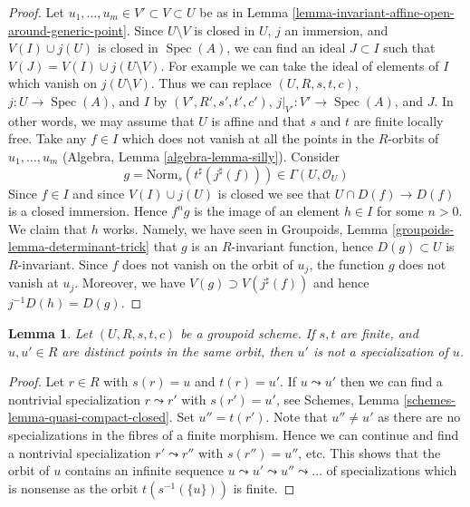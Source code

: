 \documentclass{stacks-project}
\theoremstyle{plain}
\newtheorem{lemma}[subsection]{Lemma}
\theoremstyle{definition}
\theoremstyle{remark}
\numberwithin{equation}{subsection}
\def\Spec{\mathop{\mathrm{Spec}}}
\begin{document}
\begin{proof}
Let $u_1, \ldots, u_m \in V' \subset V \subset U$ be as in
Lemma \ref{lemma-invariant-affine-open-around-generic-point}.
Since $U \setminus V$ is closed in $U$, $j$ an immersion, and $V(I) \cup j(U)$
is closed in $\Spec(A)$, we can find an ideal
$J \subset I$ such that $V(J) = V(I) \cup j(U \setminus V)$.
For example we can take the ideal of elements of $I$ which
vanish on $j(U \setminus V)$. Thus we can replace
$(U, R, s, t, c)$, $j : U \to \Spec(A)$, and $I$ by
$(V', R', s', t', c')$, $j|_{V'} : V' \to \Spec(A)$, and $J$.
In other words, we may assume that $U$ is affine and that
$s$ and $t$ are finite locally free.
Take any $f \in I$ which does not vanish at all the
points in the $R$-orbits of $u_1, \ldots, u_m$
(Algebra, Lemma \ref{algebra-lemma-silly}). Consider
$$
g = \text{Norm}_s(t^\sharp(j^\sharp(f))) \in \Gamma(U, \mathcal{O}_U)
$$
Since $f \in I$ and since $V(I) \cup j(U)$ is closed we see that
$U \cap D(f) \to D(f)$ is a closed immersion. Hence $f^ng$ is the
image of an element $h \in I$ for some $n > 0$. We claim that $h$ works.
Namely, we have seen in
Groupoids, Lemma \ref{groupoids-lemma-determinant-trick}
that $g$ is an $R$-invariant function, hence $D(g) \subset U$
is $R$-invariant. Since $f$ does not vanish on the orbit of $u_j$,
the function $g$ does not vanish at $u_j$. Moreover, we have
$V(g) \supset V(j^\sharp(f))$ and hence $j^{-1}D(h) = D(g)$.
\end{proof}

\begin{lemma}
\label{lemma-no-specializations-map-to-same-point}
Let $(U, R, s, t, c)$ be a groupoid scheme. If $s, t$ are finite,
and $u, u' \in R$ are distinct points in the same orbit,
then $u'$ is not a specialization of $u$.
\end{lemma}

\begin{proof}
Let $r \in R$ with $s(r) = u$ and $t(r) = u'$. If $u \leadsto u'$
then we can find a nontrivial specialization $r \leadsto r'$ with
$s(r') = u'$, see 
Schemes, Lemma \ref{schemes-lemma-quasi-compact-closed}.
Set $u'' = t(r')$. Note that $u'' \not = u'$ as there are no
specializations in the fibres of a finite morphism.
Hence we can continue and find a nontrivial specialization
$r' \leadsto r''$ with $s(r'') = u''$, etc. This shows that the
orbit of $u$ contains an infinite sequence
$u \leadsto u' \leadsto u'' \leadsto \ldots$
of specializations which is nonsense as the orbit
$t(s^{-1}(\{u\}))$ is finite.
\end{proof}
\end{document}
